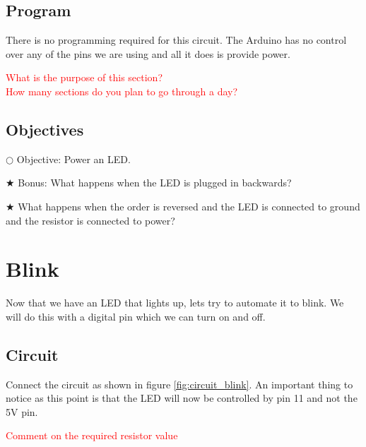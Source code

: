 \documentclass[12pt]{article}
\begin{document}
	\subsection{Program}
	
	There is no programming required for this circuit. The Arduino has no control over any of the pins we are using and all it does is provide power.
	
	\textcolor{red}{What is the purpose of this section? \\ How many sections do you plan to go through a day?}
	
	\subsection{Objectives}
	
	\noindent $\bigcirc$ Objective: Power an LED.
	
	\noindent $\bigstar$ Bonus: What happens when the LED is plugged in backwards?
	
	\indent $\bigstar$ What happens when the order is reversed and the LED is connected to ground and the resistor is connected to power?
	
	
	
	
	
	\section{Blink}
	
	Now that we have an LED that lights up, lets try to automate it to blink. We will do this with a digital pin which we can turn on and off.
	
	\subsection{Circuit}
	
	Connect the circuit as shown in figure \ref{fig:circuit_blink}. An important thing to notice as this point is that the LED will now be controlled by pin 11 and not the 5V pin.
	
	\textcolor{red}{Comment on the required resistor value}
	
\end{document}
